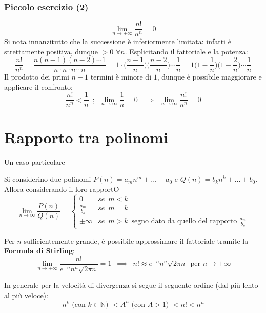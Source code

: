 \documentclass[10pt, oneside]{book}
\theoremstyle{plain}
\begin{document}
\subsubsection*{Piccolo esercizio (2)}
\[\lim \limits_{n \rightarrow + \infty} \frac{n!}{n^n} = 0\]
Si nota innanzitutto che la successione è inferiormente limitata: infatti è strettamente positiva, dunque $> 0$ $\forall n$. Esplicitando il fattoriale e la potenza:
\[\frac{n!}{n^n} = \frac{n (n-1) (n-2) \cdots 1}{n \cdot n \cdot n \cdots n} = 1 \cdot \bigg(\frac{n-1}{n}\bigg) \bigg(\frac{n-2}{n}\bigg) \cdots \frac{1}{n} = 1 \bigg(1 - \frac{1}{n}\bigg) \bigg(1 - \frac{2}{n}\bigg) \cdots \frac{1}{n}\]
Il prodotto dei primi $n-1$ termini è minore di $1$, dunque è possibile maggiorare e applicare il confronto:
\[\frac{n!}{n^n} < \frac{1}{n} \enspace ; \enspace \lim \limits_{n \rightarrow \infty} \frac{1}{n} = 0 \enspace \implies \enspace \lim \limits_{n \rightarrow \infty} \frac{n!}{n^n} = 0\]

\section{Rapporto tra polinomi}
Un caso particolare
\begin{prop}
    Si considerino due polinomi $P(n) = a_m n^m + ... + a_0$ e $Q(n) = b_k n^k + ... + b_0$. Allora considerando il loro rapportO
    \[\lim \limits_{n \rightarrow \infty} \frac{P(n)}{Q(n)} = \begin{cases}
        0 & se \enspace m < k\\
        \frac{a_m}{b_k} & se \enspace m = k\\
        \pm \infty & se \enspace m > k \enspace \textrm{segno dato da quello del rapporto } \frac{a_m}{b_k}
    \end{cases}\]
\end{prop}

\begin{oss}
    Per $n$ sufficientemente grande, è possibile approssimare il fattoriale tramite la \textbf{Formula di Stirling}:
    \[\lim \limits_{n \rightarrow +\infty} \frac{n!}{e^{-n} n^n \sqrt{2 \pi n}} = 1 \enspace \implies \enspace n! \approx e^{-n} n^n \sqrt{2 \pi n} \enspace \textrm{per } n \rightarrow +\infty\]
\end{oss}
\begin{oss}
    In generale per la velocità di divergenza si segue il seguente ordine (dal più lento al più veloce):
    \[n^k \textrm{ (con $k \in \mathbb{N}$) } < A^n \textrm{ (con $A > 1$) } < n! < n^n\]
\end{oss}
\end{document}
